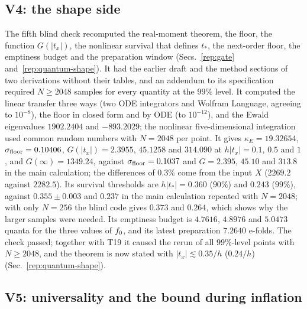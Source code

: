 \subsection{V4: the shape side}\label{sec:v19-v4}

The fifth blind check recomputed the real-moment theorem, the floor, the function $G(|t_x|)$, the nonlinear survival that defines $t_*$, the next-order floor, the emptiness budget and the preparation window (Secs.~\ref{rep:gate} and~\ref{rep:quantum-shape}).
It had the earlier draft and the method sections of two derivations without their tables, and an addendum to its specification required $N\ge2048$ samples for every quantity at the $99\%$ level.
It computed the linear transfer three ways (two ODE integrators and Wolfram Language, agreeing to $10^{-8}$), the floor in closed form and by ODE (to $10^{-12}$), and the Ewald eigenvalues $1902.2404$ and $-893.2029$; the nonlinear five-dimensional integration used common random numbers with $N=2048$ per point. %
It gives $\kappa_E=19.32654$, $\sigma_{\rm floor}=0.10406$, $G(|t_x|)=2.3955$, $45.1258$ and $314.090$ at $h|t_x|=0.1$, $0.5$ and $1$, and $G(\infty)=1349.24$, against $\sigma_{\rm floor}=0.1037$ and $G=2.395$, $45.10$ and $313.8$ in the main calculation; the differences of $0.3\%$ come from the input $X$ ($2269.2$ against $2282.5$). %
Its survival thresholds are $h|t_*|=0.360$ ($90\%$) and $0.243$ ($99\%$), against $0.355\pm0.003$ and $0.237$ in the main calculation repeated with $N=2048$; with only $N=256$ the blind code gives $0.373$ and $0.264$, which shows why the larger samples were needed. %
Its emptiness budget is $4.7616$, $4.8976$ and $5.0473$ quanta for the three values of $f_0$, and its latest preparation $7.2640$ e-folds. %
The check passed; together with T19 it caused the rerun of all $99\%$-level points with $N\ge2048$, and the theorem is now stated with $|t_x|\lesssim0.35/h$ ($0.24/h$) (Sec.~\ref{rep:quantum-shape}).

\subsection{V5: universality and the bound during inflation}\label{sec:v19-v5}

